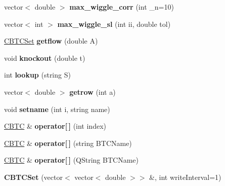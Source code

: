\begin{DoxyCompactItemize}
vector$<$ double $>$ {\bfseries max\+\_\+wiggle\+\_\+corr} (int \+\_\+n=10)
\item 
\mbox{\label{class_c_b_t_c_set_ac61c7edb7c2fb310adf9e3ded63bd108}} 
vector$<$ int $>$ {\bfseries max\+\_\+wiggle\+\_\+sl} (int ii, double tol)
\item 
\mbox{\label{class_c_b_t_c_set_ab204c26087ec2769b4300a8937b46e54}} 
\hyperlink{class_c_b_t_c_set}{C\+B\+T\+C\+Set} {\bfseries getflow} (double A)
\item 
\mbox{\label{class_c_b_t_c_set_a6472e1c96dfd548a8152d013b386dd33}} 
void {\bfseries knockout} (double t)
\item 
\mbox{\label{class_c_b_t_c_set_af9c1cff977e246d8614ba09efb462492}} 
int {\bfseries lookup} (string S)
\item 
\mbox{\label{class_c_b_t_c_set_a14945d9ed461ea13715ce063c7f4975c}} 
vector$<$ double $>$ {\bfseries getrow} (int a)
\item 
\mbox{\label{class_c_b_t_c_set_af9875c3319af88d5a0f07fdef7745ffb}} 
void {\bfseries setname} (int i, string name)
\item 
\mbox{\label{class_c_b_t_c_set_ac4429eb15e4f7f388abc6d8edc13bfc4}} 
\hyperlink{class_c_b_t_c}{C\+B\+TC} \& {\bfseries operator\mbox{[}$\,$\mbox{]}} (int index)
\item 
\mbox{\label{class_c_b_t_c_set_aa6daba4068542002e49347ac32d3bd62}} 
\hyperlink{class_c_b_t_c}{C\+B\+TC} \& {\bfseries operator\mbox{[}$\,$\mbox{]}} (string B\+T\+C\+Name)
\item 
\mbox{\label{class_c_b_t_c_set_ade28a9f8c87983003c604bdaf0259167}} 
\hyperlink{class_c_b_t_c}{C\+B\+TC} \& {\bfseries operator\mbox{[}$\,$\mbox{]}} (Q\+String B\+T\+C\+Name)
\item 
\mbox{\label{class_c_b_t_c_set_ae088d88dc53356dd1a1348252765d0a3}} 
{\bfseries C\+B\+T\+C\+Set} (vector$<$ vector$<$ double $>$$>$ \&, int write\+Interval=1)
\item 
$$
\end{DoxyCompactItemize}
